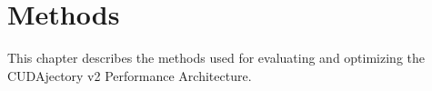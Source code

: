 \chapter{Methods}
This chapter describes the methods used for evaluating and optimizing the CUDAjectory v2 Performance Architecture.


